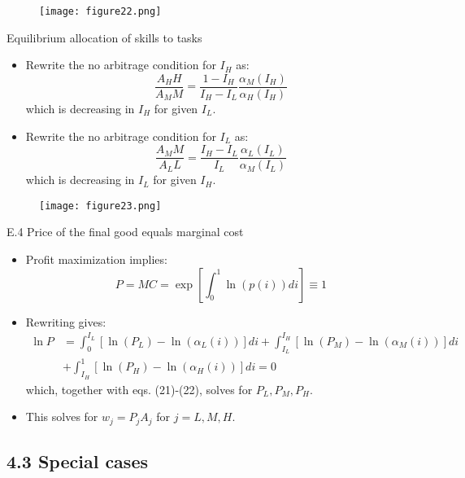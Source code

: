 \documentclass[notes=show]{beamer}
\begin{document}
\newpage
\begin{center}
\begin{figure}
\texttt{[image: figure22.png]}
\end{figure} 
\end{center}
\newpage

\begin{frame}{Equilibrium allocation of skills to tasks}
\begin{itemize}
\item Rewrite the no arbitrage condition for $I_{H}$ as:
\[
\frac{A_{H}H}{A_{M}M} = \frac{1-I_{H}}{I_{H} - I_{L}} \frac{\alpha_{M}(I_{H})}{\alpha_{H}(I_{H})}  \tag{29} \label{eq29}
\]
which is decreasing in $I_{H}$ for given $I_{L}$. \medskip
\item Rewrite the no arbitrage condition for $I_{L}$ as:
\[
\frac{A_{M}M}{A_{L}L} = \frac{I_{H} - I_{L}}{I_{L}} \frac{\alpha_{L}(I_{L})}{\alpha_{M}(I_{L})} 
\]
which is decreasing in $I_{L}$ for given $I_{H}$.
\end{itemize}
\end{frame}

\newpage
\begin{center}
\begin{figure}
\texttt{[image: figure23.png]}
\end{figure} 
\end{center}
\newpage

\begin{frame}{E.4 Price of the final good equals marginal cost}
\begin{itemize}
\item Profit maximization implies:
\[
P = MC= \exp \left[ \int_{0}^{1} \ln(p(i))di \right]  \equiv 1
\]
\item Rewriting gives:
\begin{align*}
\ln P & = \int_{0}^{I_{L}} [\ln(P_{L}) - \ln(\alpha_{L}(i))]di + \int_{I_{L}}^{I_{H}} [\ln(P_{M}) - \ln(\alpha_{M}(i))]di \\
& + \int_{I_{H}}^{1} [\ln(P_{H}) - \ln(\alpha_{H}(i))]di= 0 \tag{28} \label{eqs28}
\end{align*}
which, together with eqs. (21)-(22), solves for $ P_{L}, P_{M}, P_{H} $. \medskip
\item This solves for $w_{j}=P_{j}A_{j} $ for $ j=L,M,H $.
\end{itemize}
\end{frame}

\subsection{4.3 Special cases}
\end{document}
